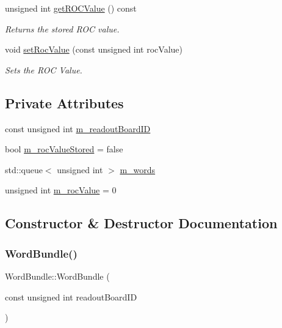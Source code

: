 \begin{DoxyCompactItemize}
unsigned int \hyperlink{class_word_bundle_ad2c91f230ac93d19900eba6b2c64d0e9}{get\+R\+O\+C\+Value} () const
\begin{DoxyCompactList}\small\item\em Returns the stored R\+OC value. \end{DoxyCompactList}\item 
void \hyperlink{class_word_bundle_a15e13fdd7380c72be2f42013560d62c3}{set\+Roc\+Value} (const unsigned int roc\+Value)
\begin{DoxyCompactList}\small\item\em Sets the R\+OC Value. \end{DoxyCompactList}\end{DoxyCompactItemize}
\subsection*{Private Attributes}
\begin{DoxyCompactItemize}
\item 
const unsigned int \hyperlink{class_word_bundle_a75e4429454ea028f2fbfa2f144330215}{m\+\_\+readout\+Board\+ID}
\item 
bool \hyperlink{class_word_bundle_a7605157c872054d7ab42b590fac97ca7}{m\+\_\+roc\+Value\+Stored} = false
\item 
std\+::queue$<$ unsigned int $>$ \hyperlink{class_word_bundle_a58233a5455b9a594e3441dd79e3d6a3b}{m\+\_\+words}
\item 
unsigned int \hyperlink{class_word_bundle_a2510a567b83584e8b53395168d53c401}{m\+\_\+roc\+Value} = 0
\end{DoxyCompactItemize}


\subsection{Constructor \& Destructor Documentation}
\mbox{\label{class_word_bundle_a56afa743b30e4b20775b7ecad180c465}} 
\subsubsection{\texorpdfstring{Word\+Bundle()}{WordBundle()}}
{\footnotesize\ttfamily Word\+Bundle\+::\+Word\+Bundle (\begin{DoxyParamCaption}\item[{const unsigned int}]{readout\+Board\+ID }\end{DoxyParamCaption})}



